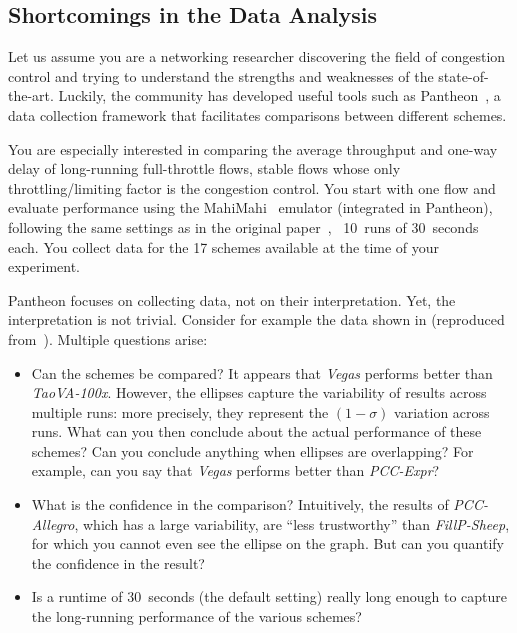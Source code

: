 \subsection{Shortcomings in the Data Analysis}
\label{subsec:triscale_intro_example}

Let us assume you are a networking researcher discovering the field of congestion control and trying to understand the strengths and weaknesses of the state-of-the-art.
Luckily, the community has developed useful tools such as Pantheon~\cite{yan18pantheon}, a data collection framework that facilitates comparisons between different schemes.

You are especially interested in comparing the average throughput and one-way delay of long-running full-throttle flows, \ie stable flows whose only throttling/limiting factor is the congestion control.
You start with one flow and evaluate performance using the MahiMahi~\cite{netravali2015mahimahi} emulator (integrated in Pantheon), following the same settings as in the original paper~\cite{yan18pantheon}, \ie~10~runs of 30~seconds each. You collect data for the 17 schemes available at the time of your experiment.

Pantheon focuses on collecting data, not on their interpretation. Yet, the interpretation is not trivial. Consider for example the data shown in  (reproduced from~\cite{yan18pantheon}). Multiple questions arise:

\begin{itemize}

    \item
    Can the schemes be compared?
    It appears that \textit{Vegas} performs better than \eg \textit{TaoVA-100x}.
    However, the ellipses capture the variability of results across multiple runs: more precisely, they represent the $(1-\sigma)$ variation across runs.
    What can you then conclude about the actual performance of these schemes?
    Can you conclude anything when ellipses are overlapping?
    For example, can you say that \textit{Vegas} performs better than \textit{PCC-Expr}?

    \item
    What is the confidence in the comparison? Intuitively, the results of \eg \textit{PCC-Allegro}, which has a large variability, are ``less trustworthy'' than \eg \textit{FillP-Sheep}, for which you cannot even see the ellipse on the graph. But can you quantify the confidence in the result?

    \item
    Is a runtime of 30~seconds (the default setting) really long enough to capture the long-running performance of the various schemes?

\end{itemize}

